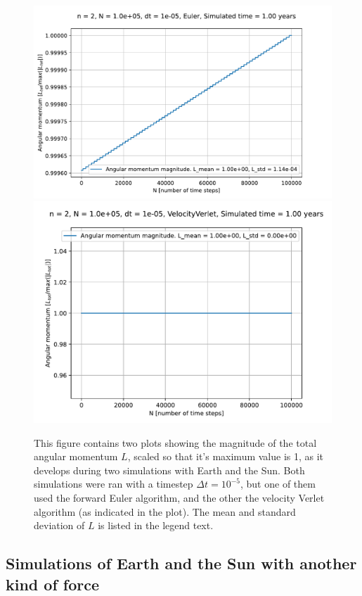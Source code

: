 \documentclass[reprint,english,notitlepage]{revtex4-1}  %
\begin{document}
\begin{figure}[H]
\includegraphics[width=\columnwidth]{../data/figures/sun-earth-3c/se_dt1e-5_fe_angmom.pdf}
\includegraphics[width=\columnwidth]{../data/figures/sun-earth-3c/se_dt1e-5_vv_angmom.pdf}
\caption{This figure contains two plots showing the magnitude of the total angular momentum $L$, scaled so that it's maximum value is 1, as it develops during two simulations with Earth and the Sun. Both simulations were ran with a timestep $\Delta t = 10^{-5}$, but one of them used the forward Euler algorithm, and the other the velocity Verlet algorithm (as indicated in the plot). The mean and standard deviation of $L$ is listed in the legend text.   }
\label{fig:se-3c-angmom}
\end{figure}


\subsection{Simulations of Earth and the Sun with another kind of force} \label{sec:IV:c}
\end{document}
